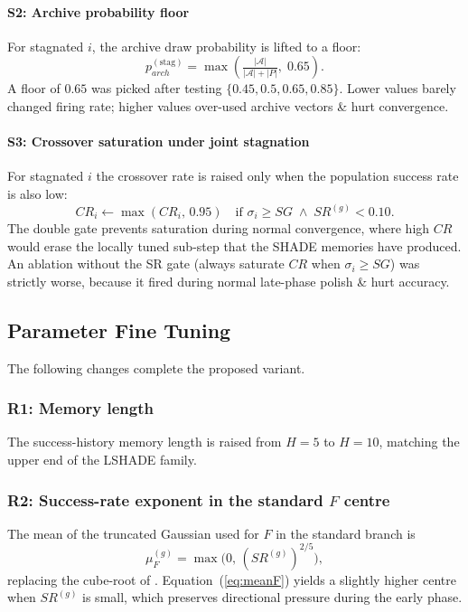 \documentclass[conference]{IEEEtran}
\begin{document}
\paragraph*{S2: Archive probability floor}
For stagnated $i$, the archive draw probability is lifted to a floor:
\begin{equation}
p_{arch}^{(\text{stag})} = \max\!\left(\tfrac{|\mathcal{A}|}{|\mathcal{A}|+|P|},\; 0.65\right).
\label{eq:override2}
\end{equation}
A floor of $0.65$ was picked after testing $\{0.45, 0.5, 0.65, 0.85\}$. Lower values barely changed firing rate; higher values over-used archive vectors \& hurt convergence.

\paragraph*{S3: Crossover saturation under joint stagnation}
For stagnated $i$ the crossover rate is raised only when the population success rate is also low:
\begin{equation}
CR_i \leftarrow \max(CR_i,\, 0.95) \quad \text{if } \sigma_i \ge SG \;\wedge\; SR^{(g)} < 0.10.
\label{eq:override3}
\end{equation}
The double gate prevents saturation during normal convergence, where high $CR$ would erase the locally tuned sub-step that the SHADE memories have produced. An ablation without the SR gate (always saturate $CR$ when $\sigma_i \ge SG$) was strictly worse, because it fired during normal late-phase polish \& hurt accuracy.

\subsection{Parameter Fine Tuning}
\label{sec:fine-tunings}
The following changes complete the proposed variant.

\subsubsection*{R1: Memory length}
The success-history memory length is raised from $H = 5$ to $H = 10$, matching the upper end of the LSHADE family.

\subsubsection*{R2: Success-rate exponent in the standard $F$ centre}
The mean of the truncated Gaussian used for $F$ in the standard branch is
\begin{equation}
\mu_F^{(g)} = \max\!\bigl(0,\, (SR^{(g)})^{2/5}\bigr),
\label{eq:meanF}
\end{equation}
replacing the cube-root of \cite{tao2026rdex}. Equation~(\ref{eq:meanF}) yields a slightly higher centre when $SR^{(g)}$ is small, which preserves directional pressure during the early phase.
\end{document}

